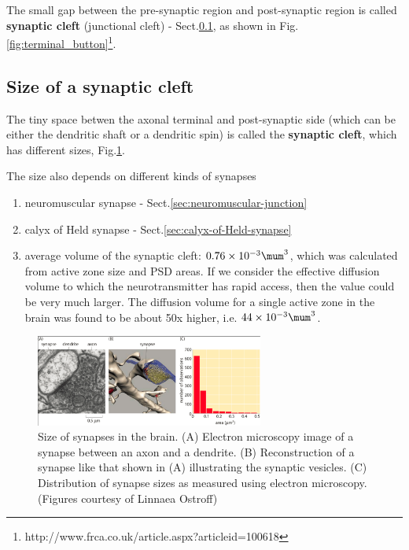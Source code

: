 The small gap between the pre-synaptic region and post-synaptic region is called
{\bf synaptic cleft} (junctional cleft) - Sect.\ref{sec:synaptic-cleft}, as
shown in Fig.\ref{fig:terminal_button}\footnote{http://www.frca.co.uk/article.aspx?articleid=100618}.

\subsection{Size of a synaptic cleft}
\label{sec:synaptic-cleft}

The tiny space betwen the axonal terminal and post-synaptic side (which can be
either the dendritic shaft or a dendritic spin) is called the {\bf synaptic
cleft}, which has different sizes, Fig.\ref{fig:synapse-size}.

The size also depends on different kinds of synapses
\begin{enumerate}
  \item neuromuscular synapse - Sect.\ref{sec:neuromuscular-junction}
  
  \item calyx of Held synapse - Sect.\ref{sec:calyx-of-Held-synapse}
  
  \item 
  
  average volume of the synaptic cleft: $0.76 \times 10^{-3} \mum^3$, which was
  calculated from active zone size and PSD areas.
  If we consider the effective diffusion volume to which the neurotransmitter
  has rapid access, then the value could be very much larger. The diffusion
  volume for a single active zone in the brain was found to be about 50x
  higher, i.e. $44 \times 10^{-3} \mum^3$.
  
  
  
\end{enumerate}


\begin{figure}[hbt]
  \centerline{\includegraphics[height=3cm,
    angle=0]{./images/synapse-size.eps}}
  \caption{Size of synapses in the brain. (A) Electron microscopy image of a
  synapse between an axon and a dendrite. (B) Reconstruction of a synapse like
  that shown in (A) illustrating the synaptic vesicles. (C) Distribution of
  synapse sizes as measured using electron microscopy. (Figures courtesy of
  Linnaea Ostroff) }
\label{fig:synapse-size}
\end{figure}



